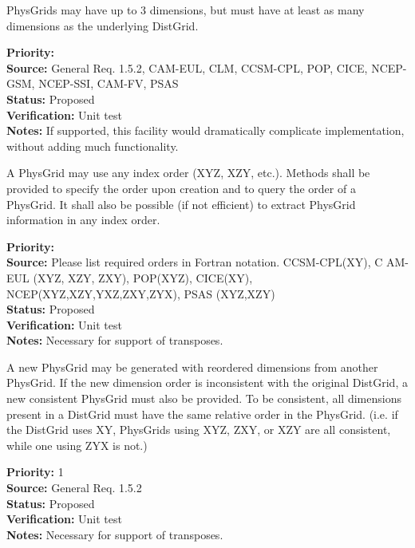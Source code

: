 PhysGrids may have up to 3 dimensions, but must have at least as many dimensions as the
underlying DistGrid. 
\begin{reqlist}
{\bf Priority:}  \\
{\bf Source:} General Req. 1.5.2, CAM-EUL, CLM, CCSM-CPL, POP, CICE, NCEP-GSM, NCEP-SSI,
              CAM-FV, PSAS \\
{\bf Status:} Proposed \\
{\bf Verification:} Unit test\\
{\bf Notes:} If supported, this facility would dramatically complicate implementation,
without adding much functionality.
\end{reqlist}

A PhysGrid may use any index order (XYZ, XZY, etc.).  Methods shall be provided to
specify the order upon creation and to query the order of a PhysGrid.  It shall
also be possible (if not efficient) to extract PhysGrid information in any index
order.
\begin{reqlist}
{\bf Priority:}  \\
{\bf Source:} Please list required orders in Fortran notation. CCSM-CPL(XY), C
AM-EUL (XYZ, XZY, ZXY), POP(XYZ), CICE(XY), NCEP(XYZ,XZY,YXZ,ZXY,ZYX),
PSAS (XYZ,XZY) \\
{\bf Status:} Proposed \\
{\bf Verification:} Unit test\\
{\bf Notes:} Necessary for support of transposes.
\end{reqlist}

A new PhysGrid may be generated with reordered dimensions from another PhysGrid.
If the new dimension order is inconsistent with the original DistGrid, a new
consistent PhysGrid must also be provided.  To be consistent, all dimensions present
in a DistGrid must have the same relative order in the PhysGrid.  (i.e. if the
DistGrid uses XY, PhysGrids using XYZ, ZXY, or XZY are all consistent, while one using
ZYX is not.)
\begin{reqlist}
{\bf Priority:} 1 \\
{\bf Source:} General Req. 1.5.2 \\
{\bf Status:} Proposed \\
{\bf Verification:} Unit test\\
{\bf Notes:} Necessary for support of transposes.
\end{reqlist}

